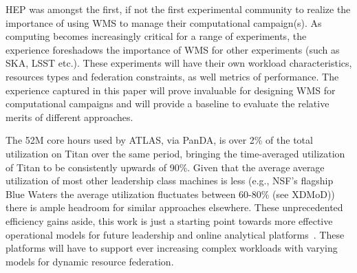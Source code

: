 
HEP was amongst the first, if not the first experimental community to realize
the importance of using WMS to manage their computational campaign(s). As
computing becomes increasingly critical for a range of experiments, the
experience foreshadows the importance of WMS for other experiments (such as
SKA, LSST etc.).  These experiments will have their own workload
characteristics, resources types and federation constraints, as well metrics
of performance. The experience captured in this paper will prove
invaluable for designing WMS for computational campaigns and will provide a
baseline to evaluate the relative merits of different approaches.

The 52M core hours used by ATLAS, via PanDA, is over 2\% of the total
utilization on Titan over the same period, bringing the time-averaged
utilization of Titan to be consistently upwards of 90\%. Given that the
average average utilization of most other leadership class machines is less
(e.g., NSF's flagship Blue Waters the average utilization fluctuates between
60-80\% (see XDMoD\cite{bw-sucks})) there is ample headroom for similar
approaches elsewhere. These unprecedented efficiency gains aside, this work is
just a starting point towards more effective operational models for future
leadership and online analytical platforms~\cite{foap-url}. These platforms
will have to support ever increasing complex workloads with varying models for
dynamic resource federation. 

